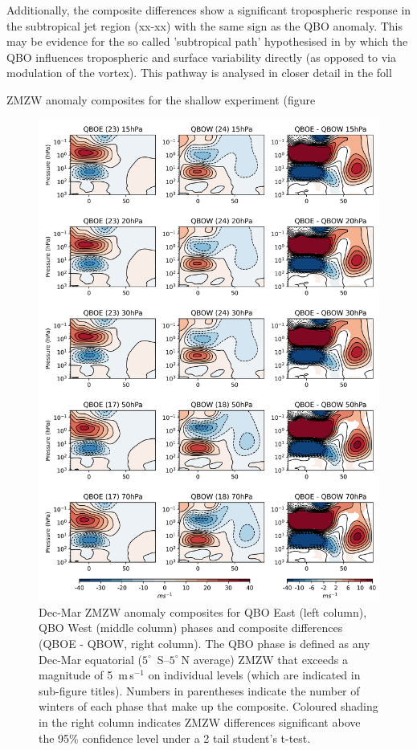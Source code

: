 Additionally, the composite differences show a significant tropospheric response in the subtropical jet region (xx-xx) with the same sign as the QBO anomaly. This may be evidence for the so called 'subtropical path' hypothesised in \cite{graySurface2018} by which the QBO influences tropospheric and surface variability directly (as opposed to via modulation of the vortex). This pathway is analysed in closer detail in the foll

ZMZW anomaly composites for the shallow experiment (figure 


\begin{figure}[h!]
\begin{center}
\noindent\includegraphics[width = \linewidth]{Figures/Figures-deepQBO/ZMZW_composites_QBO_phases_U_d_higher_DJFMQBO_vs_DJFM_70hPa_5thresh.png}
\caption[]{Dec-Mar ZMZW anomaly composites for QBO East (left column), QBO West (middle column) phases and composite differences (QBOE - QBOW, right column). The QBO phase is defined as any Dec-Mar equatorial ($5^{\circ}$\ S--$5^{\circ}\ $N average) ZMZW that exceeds a magnitude of 5\ m\,s$^{-1}$ on individual levels (which are indicated in sub-figure titles). Numbers in parentheses indicate the number of winters of each phase that make up the composite. Coloured shading in the right column indicates ZMZW differences significant above the 95\% confidence level under a 2 tail student’s t-test.}
\label{fig:HT_deep}
\end{center}
\end{figure}


